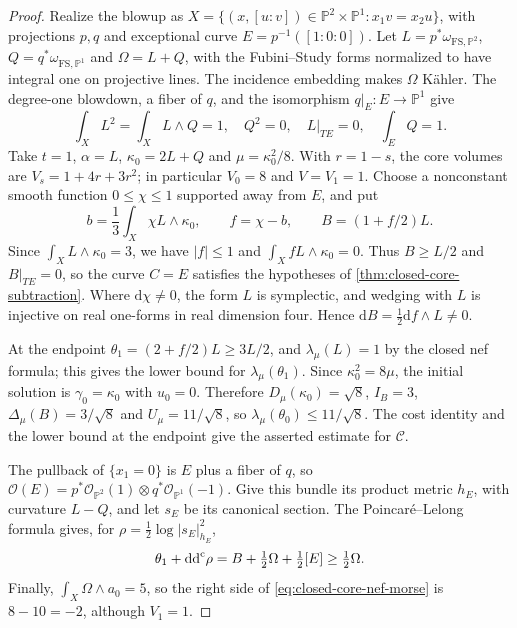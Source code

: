 \begin{proof}
Realize the blowup as
$X=\{(x,[u:v])\in\mathbb P^2\times\mathbb P^1:x_1v=x_2u\}$,
with projections $p,q$ and exceptional curve $E=p^{-1}([1:0:0])$.
Let $L=p^*\omega_{\mathrm{FS},\mathbb P^2}$, $Q=q^*\omega_{\mathrm{FS},\mathbb P^1}$ and $\Omega=L+Q$, with the Fubini--Study forms normalized to have integral one on projective lines. The incidence embedding makes $\Omega$ K\"ahler. The degree-one blowdown, a fiber of $q$, and the isomorphism $q|_E\colon E\to\mathbb P^1$ give
\[
 \int_XL^2=\int_XL\wedge Q=1,\quad Q^2=0,\quad L|_{TE}=0,\quad\int_EQ=1.
\]
Take $t=1$, $\alpha=L$, $\kappa_0=2L+Q$ and $\mu=\kappa_0^2/8$. With $r=1-s$, the core volumes are $V_s=1+4r+3r^2$; in particular $V_0=8$ and $V=V_1=1$.
Choose a nonconstant smooth function $0\leq\chi\leq1$ supported away from $E$, and put
\[
 b=\frac13\int_X\chi L\wedge\kappa_0,\qquad
 f=\chi-b,\qquad B=(1+f/2)L.
\]
Since $\int_XL\wedge\kappa_0=3$, we have $|f|\leq1$ and
$\int_XfL\wedge\kappa_0=0$. Thus $B\geq L/2$ and $B|_{TE}=0$, so the curve $C=E$ satisfies the hypotheses of \cref{thm:closed-core-subtraction}.
Where $\mathrm{d}\chi\ne0$, the form $L$ is symplectic, and wedging with $L$ is injective on real one-forms in real dimension four. Hence $\mathrm{d}B=\tfrac12\mathrm{d}f\wedge L\ne0$.

At the endpoint $\theta_1=(2+f/2)L\geq3L/2$, and $\lambda_\mu(L)=1$ by the closed nef formula; this gives the lower bound for $\lambda_\mu(\theta_1)$. Since $\kappa_0^2=8\mu$, the initial solution is $\gamma_0=\kappa_0$ with $u_0=0$. Therefore
$D_\mu(\kappa_0)=\sqrt8$, $I_B=3$, $\Delta_\mu(B)=3/\sqrt8$ and $U_\mu=11/\sqrt8$, so $\lambda_\mu(\theta_0)\leq11/\sqrt8$. The cost identity and the lower bound at the endpoint give the asserted estimate for $\mathcal C$.

The pullback of $\{x_1=0\}$ is $E$ plus a fiber of $q$, so
$\mathcal O(E)=p^*\mathcal O_{\mathbb P^2}(1)\otimes q^*\mathcal O_{\mathbb P^1}(-1)$.
Give this bundle its product metric $h_E$, with curvature $L-Q$, and let $s_E$ be its canonical section. The Poincar\'e--Lelong formula gives, for $\rho=\tfrac12\log|s_E|_{h_E}^2$,
\[
 \theta_1+\mathrm{dd}^{\mathrm{c}}\rho=B+\tfrac12\Omega+\tfrac12[E]\geq\tfrac12\Omega.
\]
Finally, $\int_X\Omega\wedge a_0=5$, so the right side of \eqref{eq:closed-core-nef-morse} is $8-10=-2$, although $V_1=1$.
\end{proof}
